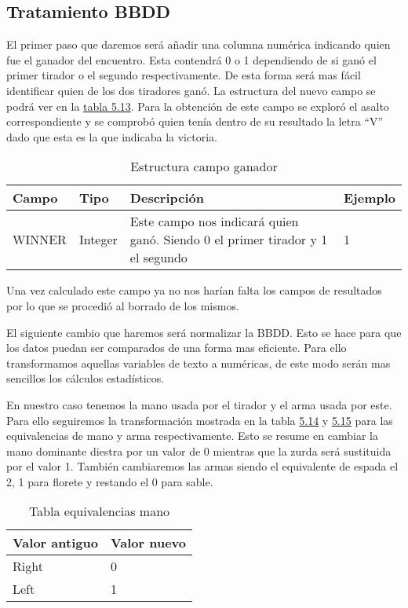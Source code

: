 \subsection{Tratamiento BBDD}

El primer paso que daremos será añadir una columna numérica indicando quien
fue el ganador del encuentro. Esta contendrá 0 o 1 dependiendo de si ganó
el primer tirador o el segundo respectivamente. De esta forma será mas fácil
identificar quien de los dos tiradores ganó. La estructura del nuevo campo
se podrá ver en la \hyperref[tab:Estructura campo ganador]{tabla 5.13}. Para la obtención de este campo se exploró
el asalto correspondiente y se comprobó quien tenía dentro de su resultado
la letra \enquote{V} dado que esta es la que indicaba la victoria.

\begin{longtable}{|p{3cm}p{2cm}p{6cm}p{3cm}|}
  \caption{Estructura campo ganador}
  \label{tab:Estructura campo ganador}
  \endfirsthead
  \endhead

  \hline
  \rowcolor[HTML]{C0C0C0}
  Campo & Tipo & Descripción & Ejemplo \\ \hline
  WINNER & Integer & Este campo nos indicará quien ganó. Siendo 0 el primer tirador y 1 el segundo & 1 \\ \hline
\end{longtable}

Una vez calculado este campo ya no nos harían falta los campos de resultados
por lo que se procedió al borrado de los mismos.

El siguiente cambio que haremos será normalizar la BBDD. Esto se hace para
que los datos puedan ser comparados de una forma mas eficiente. Para ello
transformamos aquellas variables de texto a numéricas, de este modo serán
mas sencillos los cálculos estadísticos.

En nuestro caso tenemos la mano usada por el tirador y el arma usada por este.
Para ello seguiremos la transformación mostrada en la tabla \hyperref[tab:Tabla equivalencias mano]{5.14} y \hyperref[tab:Tabla equivalencias arma]{5.15} para
las equivalencias de mano y arma respectivamente. Esto se resume en
cambiar la mano dominante diestra por un valor de 0 mientras que la zurda será
sustituida por el valor 1. También cambiaremos las armas siendo el equivalente
de espada el 2, 1 para florete y restando el 0 para sable.

\begin{table}[]
  \centering
  \caption{Tabla equivalencias mano}
  \label{tab:Tabla equivalencias mano}
  \begin{tabular}{|ll|}
    \hline
    \rowcolor[HTML]{C0C0C0}
    Valor antiguo & Valor nuevo \\ \hline
    Right & 0 \\ \hline
    Left & 1 \\ \hline
  \end{tabular}
\end{table}

